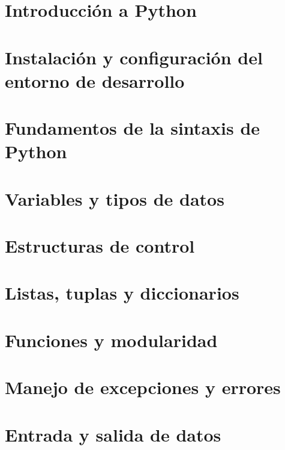 \documentclass{article}
\begin{document}
\tableofcontents 

\section{Introducción a Python}



\section{Instalación y configuración del entorno de desarrollo}



\section{Fundamentos de la sintaxis de Python}



\section{Variables y tipos de datos}



\section{Estructuras de control}



\section{Listas, tuplas y diccionarios}



\section{Funciones y modularidad}



\section{Manejo de excepciones y errores}



\section{Entrada y salida de datos}
\end{document}
